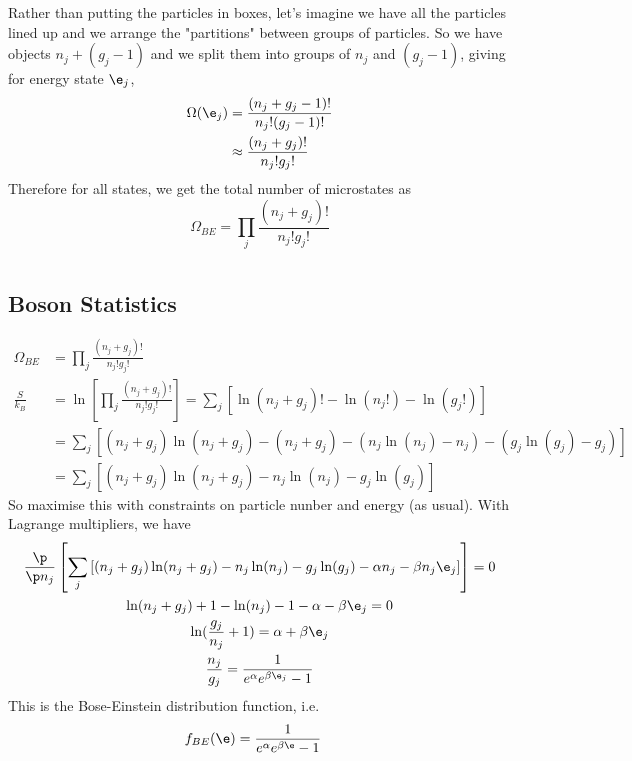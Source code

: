 \documentclass[a4paper, 11pt, normalem]{report}
\begin{document}
Rather than putting the particles in boxes, let's imagine we have all the particles lined up and we arrange the "partitions" between groups of particles. 
So we have objects $n_j+(g_j-1)$ and we split them into groups of $n_j$ and $(g_j-1)$, giving for energy state $\e_j$,
\begin{align}
    \Omega(\e_j) &= \frac{(n_j+g_j-1)!}{n_j!(g_j-1)!} \\ 
                 &\approx \frac{(n_j+g_j)!}{n_j!g_j!} \\
\end{align}
Therefore for all states, we get the total number of microstates as
\begin{equation}
    \Omega_{BE} = \prod_j \frac{(n_j+g_j)!}{n_j!g_j!}
\end{equation}


\chapter{}
\section{Boson Statistics}
\begin{align}
    \Omega_{BE} &= \prod_j \frac{(n_j + g_j)!}{n_j!g_j!} \\
    \frac{S}{k_B} &= \ln\left[\prod_j \frac{(n_j+g_j)!}{n_j!g_j!}\right] = \sum_j \left[\ln(n_j + g_j)! - \ln(n_j!) - \ln(g_j!)\right] \\
                  &= \sum_j \left[(n_j+g_j)\ln(n_j+g_j) - (n_j+g_j) - (n_j\ln(n_j) - n_j) - (g_j\ln(g_j) - g_j)\right] \\
                  &= \sum_j \left[(n_j+g_j)\ln(n_j+g_j) - n_j\ln(n_j) - g_j\ln(g_j)\right]
\end{align}
So maximise this with constraints on particle nunber and energy (as usual). 
With Lagrange multipliers, we have
\begin{gather}
    \frac{\p}{\p n_j}\left[\sum_j\left[(n_j+g_j)\ln(n_j+g_j) - n_j\ln(n_j) - g_j\ln(g_j) - \alpha n_j - \beta n_j\e_j\right]\right] = 0 \\
    \ln(n_j+g_j) + 1 - \ln(n_j) - 1 - \alpha - \beta\e_j = 0 \\
    \ln(\frac{g_j}{n_j} + 1) = \alpha + \beta\e_j \\
    \frac{n_j}{g_j} = \frac{1}{e^{\alpha}e^{\beta\e_j}-1}
\end{gather}
This is the Bose-Einstein distribution function, i.e.
\begin{align}
    f_{BE}(\e) &= \frac{1}{e^{\alpha}e^{\beta\e}-1}
\end{align}
\end{document}
